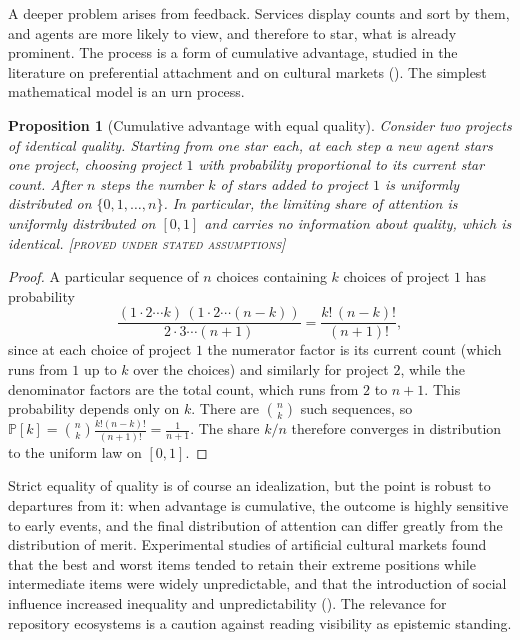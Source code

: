 \documentclass[11pt,twoside,openright]{book}
\theoremstyle{plain}
\newtheorem{proposition}[theorem]{Proposition}
\theoremstyle{definition}
\theoremstyle{remark}
\newcommand{\Proved}{\textup{\textsc{[proved under stated assumptions]}}}
\newcommand{\Prob}{\mathbb{P}}
\begin{document}
A deeper problem arises from feedback. Services display counts and sort by them, and agents are more likely to view, and therefore to star, what is already prominent. The process is a form of cumulative advantage, studied in the literature on preferential attachment and on cultural markets (\cite{barabasi1999, salganik2006}). The simplest mathematical model is an urn process.

\begin{proposition}[Cumulative advantage with equal quality]\label{prop:polya}
Consider two projects of identical quality. Starting from one star each, at each step a new agent stars one project, choosing project $1$ with probability proportional to its current star count. After $n$ steps the number $k$ of stars added to project $1$ is uniformly distributed on $\{0,1,\dots,n\}$. In particular, the limiting share of attention is uniformly distributed on $[0,1]$ and carries no information about quality, which is identical.
\Proved{}
\end{proposition}

\begin{proof}
A particular sequence of $n$ choices containing $k$ choices of project $1$ has probability
\[
\frac{(1\cdot2\cdots k)\,(1\cdot 2\cdots (n-k))}{2\cdot3\cdots(n+1)}
=\frac{k!\,(n-k)!}{(n+1)!},
\]
since at each choice of project $1$ the numerator factor is its current count (which runs from $1$ up to $k$ over the choices) and similarly for project $2$, while the denominator factors are the total count, which runs from $2$ to $n+1$. This probability depends only on $k$. There are $\binom{n}{k}$ such sequences, so $\Prob[k]=\binom{n}{k}\frac{k!(n-k)!}{(n+1)!}=\frac{1}{n+1}$. The share $k/n$ therefore converges in distribution to the uniform law on $[0,1]$.
\end{proof}

Strict equality of quality is of course an idealization, but the point is robust to departures from it: when advantage is cumulative, the outcome is highly sensitive to early events, and the final distribution of attention can differ greatly from the distribution of merit. Experimental studies of artificial cultural markets found that the best and worst items tended to retain their extreme positions while intermediate items were widely unpredictable, and that the introduction of social influence increased inequality and unpredictability (\cite{salganik2006}). The relevance for repository ecosystems is a caution against reading visibility as epistemic standing.
\end{document}
